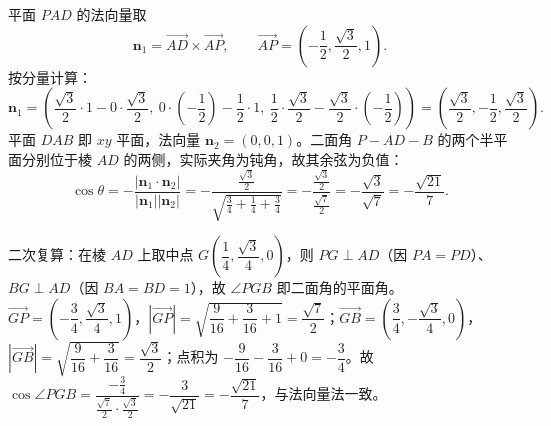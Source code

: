 \begin{answer}
平面 $PAD$ 的法向量取
\nopagebreak[4]
\[\boldsymbol n_1=\overrightarrow{AD}\times\overrightarrow{AP},\qquad \overrightarrow{AP}=\left(-\frac12,\frac{\sqrt3}{2},1\right).\]
按分量计算：
\nopagebreak[4]
\[\boldsymbol n_1=\left(\frac{\sqrt3}{2}\cdot1-0\cdot\frac{\sqrt3}{2},\ 0\cdot\left(-\frac12\right)-\frac12\cdot1,\ \frac12\cdot\frac{\sqrt3}{2}-\frac{\sqrt3}{2}\cdot\left(-\frac12\right)\right)=\left(\frac{\sqrt3}{2},-\frac12,\frac{\sqrt3}{2}\right).\]
平面 $DAB$ 即 $xy$ 平面，法向量 $\boldsymbol n_2=(0,0,1)$。二面角 $P-AD-B$ 的两个半平面分别位于棱 $AD$ 的两侧，实际夹角为钝角，故其余弦为负值：
\nopagebreak[4]
\[\cos\theta=-\frac{|\boldsymbol n_1\cdot\boldsymbol n_2|}{|\boldsymbol n_1||\boldsymbol n_2|}=-\frac{\frac{\sqrt3}{2}}{\sqrt{\frac34+\frac14+\frac34}}=-\frac{\frac{\sqrt3}{2}}{\frac{\sqrt7}{2}}=-\frac{\sqrt3}{\sqrt7}=-\frac{\sqrt{21}}{7}.\]

二次复算：在棱 $AD$ 上取中点 $G\left(\dfrac14,\dfrac{\sqrt3}{4},0\right)$，则 $PG\perp AD$（因 $PA=PD$）、$BG\perp AD$（因 $BA=BD=1$），故 $\angle PGB$ 即二面角的平面角。$\overrightarrow{GP}=\left(-\dfrac34,\dfrac{\sqrt3}{4},1\right)$，$|\overrightarrow{GP}|=\sqrt{\dfrac{9}{16}+\dfrac{3}{16}+1}=\dfrac{\sqrt7}{2}$；$\overrightarrow{GB}=\left(\dfrac34,-\dfrac{\sqrt3}{4},0\right)$，$|\overrightarrow{GB}|=\sqrt{\dfrac{9}{16}+\dfrac{3}{16}}=\dfrac{\sqrt3}{2}$；点积为 $-\dfrac{9}{16}-\dfrac{3}{16}+0=-\dfrac34$。故 $\cos\angle PGB=\dfrac{-\frac34}{\frac{\sqrt7}{2}\cdot\frac{\sqrt3}{2}}=-\dfrac{3}{\sqrt{21}}=-\dfrac{\sqrt{21}}{7}$，与法向量法一致。



\end{answer}
